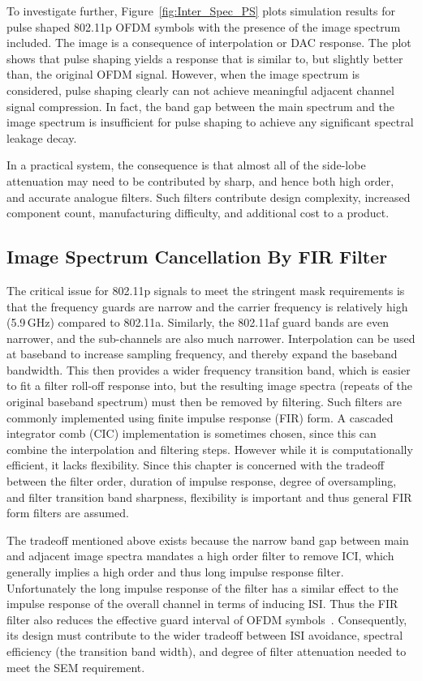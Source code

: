 To investigate further, Figure~\ref{fig:Inter_Spec_PS} plots simulation results for pulse shaped 802.11p OFDM symbols with the presence of the image spectrum included.
The image is a consequence of interpolation or DAC response.
The plot shows that pulse shaping yields a response that is similar to, but slightly better than, the original OFDM signal.
However, when the image spectrum is considered, pulse shaping clearly can not achieve meaningful adjacent channel signal compression.
In fact, the band gap between the main spectrum and the image spectrum is insufficient for pulse shaping to achieve any significant spectral leakage decay.

In a practical system, the consequence is that almost all of the side-lobe attenuation may need to be contributed by sharp, and hence both high order, and accurate analogue filters.
Such filters contribute design complexity, increased component count, manufacturing difficulty, and additional cost to a product.

\subsection{Image Spectrum Cancellation By FIR Filter}
\label{subsec:FIR}
The critical issue for 802.11p signals to meet the stringent mask requirements is that the frequency guards are narrow and the carrier frequency is relatively high (5.9\,GHz) compared to 802.11a.
Similarly, the 802.11af guard bands are even narrower, and the sub-channels are also much narrower.
Interpolation can be used at baseband to increase sampling frequency, and thereby expand the baseband bandwidth.
This then provides a wider frequency transition band, which is easier to fit a filter roll-off response into, but the resulting image spectra (repeats of the original baseband spectrum) must then be removed by filtering.
Such filters are commonly implemented using finite impulse response (FIR) form.
A cascaded integrator comb (CIC) implementation is sometimes chosen, since this can combine the interpolation and filtering steps.
However while it is computationally efficient, it lacks flexibility.
Since this chapter is concerned with the tradeoff between the filter order, duration of impulse response, degree of oversampling, and filter transition band sharpness, flexibility is important and thus general FIR form filters are assumed.

The tradeoff mentioned above exists because the narrow band gap between main and adjacent image spectra mandates a high order filter to remove ICI, which generally implies a high order and thus long impulse response filter.
Unfortunately the long impulse response of the filter has a similar effect to the impulse response of the overall channel in terms of inducing ISI.
Thus the FIR filter also reduces the effective guard interval of OFDM symbols~\cite{farhang2008signal}.
Consequently, its design must contribute to the wider tradeoff between ISI avoidance, spectral efficiency (the transition band width), and degree of filter attenuation needed to meet the SEM requirement.

